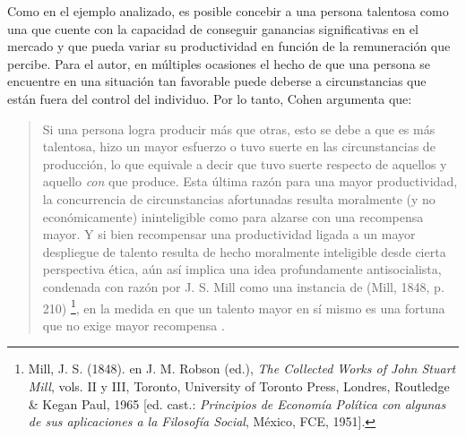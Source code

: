 Como en el ejemplo analizado, es posible concebir a una persona talentosa como una que cuente con la capacidad de conseguir ganancias significativas en el mercado y que pueda variar su productividad en función de la remuneración que percibe. Para el autor, en múltiples ocasiones el hecho de que una persona se encuentre en una situación tan favorable puede deberse a circunstancias que están fuera del control del individuo. Por lo tanto, Cohen argumenta que:

\vspace{3mm}
\begin{quote}
    Si una persona logra producir más que otras, esto se debe a que es más talentosa, hizo un mayor esfuerzo o tuvo suerte en las circunstancias de producción, lo que equivale a decir que tuvo suerte respecto de aquellos y aquello \textit{con} que produce. Esta última razón para una mayor productividad, la concurrencia de circunstancias afortunadas resulta moralmente (y no económicamente) ininteligible como para alzarse con una recompensa mayor. Y si bien recompensar una productividad ligada a un mayor despliegue de talento resulta de hecho moralmente inteligible desde cierta perspectiva ética, aún así implica una idea profundamente antisocialista, condenada con razón por J. S. Mill como una instancia de  (Mill, 1848, p. 210) \footnote{Mill, J. S. (1848).  en J. M. Robson (ed.), \textit{The Collected Works of John Stuart Mill}, vols. II y III, Toronto, University of Toronto Press, Londres, Routledge \& Kegan Paul, 1965 [ed. cast.: \textit{Principios de Economía Política con algunas de sus aplicaciones a la Filosofía Social}, México, FCE, 1951].}, en la medida en que un talento mayor en sí mismo es una fortuna que no exige mayor recompensa \citep[p. 65]{Cohen_2014b}.
\end{quote}
\vspace{3mm}

